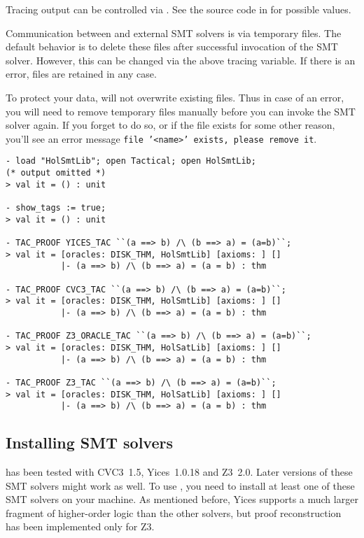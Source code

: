 Tracing output can be controlled via .  See the source code in  for
possible values.

Communication between \HOL{} and external SMT solvers is via temporary
files.  The default behavior is to delete these files after successful
invocation of the SMT solver.  However, this can be changed via the
above tracing variable.  If there is an error, files are retained in
any case.

To protect your data,  will not overwrite existing
files.  Thus in case of an error, you will need to remove temporary
files manually before you can invoke the SMT solver again.  If you
forget to do so, or if the file exists for some other reason, you'll
see an error message \texttt{file '<name>' exists, please remove it}.

\begin{session}
\begin{verbatim}
- load "HolSmtLib"; open Tactical; open HolSmtLib;
(* output omitted *)
> val it = () : unit

- show_tags := true;
> val it = () : unit

- TAC_PROOF YICES_TAC ``(a ==> b) /\ (b ==> a) = (a=b)``;
> val it = [oracles: DISK_THM, HolSmtLib] [axioms: ] []
           |- (a ==> b) /\ (b ==> a) = (a = b) : thm

- TAC_PROOF CVC3_TAC ``(a ==> b) /\ (b ==> a) = (a=b)``;
> val it = [oracles: DISK_THM, HolSmtLib] [axioms: ] []
           |- (a ==> b) /\ (b ==> a) = (a = b) : thm

- TAC_PROOF Z3_ORACLE_TAC ``(a ==> b) /\ (b ==> a) = (a=b)``;
> val it = [oracles: DISK_THM, HolSatLib] [axioms: ] []
           |- (a ==> b) /\ (b ==> a) = (a = b) : thm

- TAC_PROOF Z3_TAC ``(a ==> b) /\ (b ==> a) = (a=b)``;
> val it = [oracles: DISK_THM, HolSatLib] [axioms: ] []
           |- (a ==> b) /\ (b ==> a) = (a = b) : thm
\end{verbatim}
\end{session}

\subsection{Installing SMT solvers}

 has been tested with CVC3~1.5, Yices~1.0.18 and Z3~2.0.
Later versions of these SMT solvers might work as well.  To use
, you need to install at least one of these SMT solvers
on your machine.  As mentioned before, Yices supports a much larger
fragment of higher-order logic than the other solvers, but proof
reconstruction has been implemented only for Z3.

